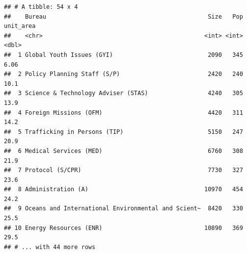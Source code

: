 \documentclass[12pt,letterpaperpaper,openany]{book}
\begin{document}
\begin{verbatim}
## # A tibble: 54 x 4
##    Bureau                                              Size   Pop unit_area
##    <chr>                                              <int> <int>     <dbl>
##  1 Global Youth Issues (GYI)                           2090   345      6.06
##  2 Policy Planning Staff (S/P)                         2420   240     10.1 
##  3 Science & Technology Adviser (STAS)                 4240   305     13.9 
##  4 Foreign Missions (OFM)                              4420   311     14.2 
##  5 Trafficking in Persons (TIP)                        5150   247     20.9 
##  6 Medical Services (MED)                              6760   308     21.9 
##  7 Protocol (S/CPR)                                    7730   327     23.6 
##  8 Administration (A)                                 10970   454     24.2 
##  9 Oceans and International Environmental and Scient~  8420   330     25.5 
## 10 Energy Resources (ENR)                             10890   369     29.5 
## # ... with 44 more rows
\end{verbatim}
\end{document}
